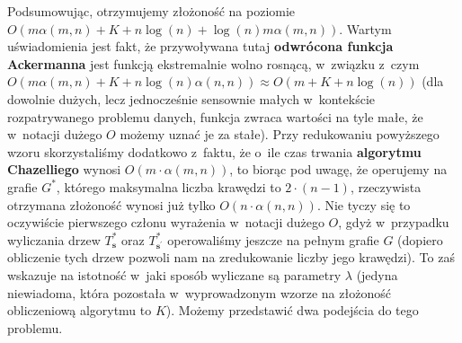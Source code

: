 Podsumowując, otrzymujemy złożoność na poziomie $O \left( m \alpha \left( m, n \right) + K + n \log \left( n \right) + \log \left( n \right) m \alpha \left( m, n \right) \right)$.
Wartym uświadomienia jest fakt, że przywoływana tutaj \textbf{odwrócona funkcja Ackermanna} jest funkcją ekstremalnie wolno rosnącą, w~związku z~czym $O \left( m \alpha \left( m, n \right) + K + n \log \left( n \right) \alpha \left( n, n \right) \right) \approx O \left( m + K + n \log \left( n \right) \right)$ (dla dowolnie dużych, lecz jednocześnie sensownie małych w~kontekście rozpatrywanego problemu danych, funkcja zwraca wartości na tyle małe, że w~notacji dużego $O$ możemy uznać je za stałe).
Przy redukowaniu powyższego wzoru skorzystaliśmy dodatkowo z~faktu, że o~ile czas trwania \textbf{algorytmu Chazelliego} wynosi $O \left( m \cdot \alpha \left( m, n \right) \right)$, to biorąc pod uwagę, że operujemy na grafie $G^{\ast}$, którego maksymalna liczba krawędzi to $2 \cdot \left( n - 1 \right)$, rzeczywista otrzymana złożoność wynosi już tylko $O \left( n \cdot \alpha \left( n, n \right) \right)$.
Nie tyczy się to oczywiście pierwszego członu wyrażenia w~notacji dużego $O$, gdyż w~przypadku wyliczania drzew $T^{\ast}_{\textbf{s}}$ oraz $T^{\ast}_{\textbf{s}^{\prime}}$ operowaliśmy jeszcze na pełnym grafie $G$ (dopiero obliczenie tych drzew pozwoli nam na zredukowanie liczby jego krawędzi).
To zaś wskazuje na istotność w~jaki sposób wyliczane są parametry $\lambda$ (jedyna niewiadoma, która pozostała w~wyprowadzonym wzorze na złożoność obliczeniową algorytmu to $K$).
Możemy przedstawić dwa podejścia do tego problemu.

